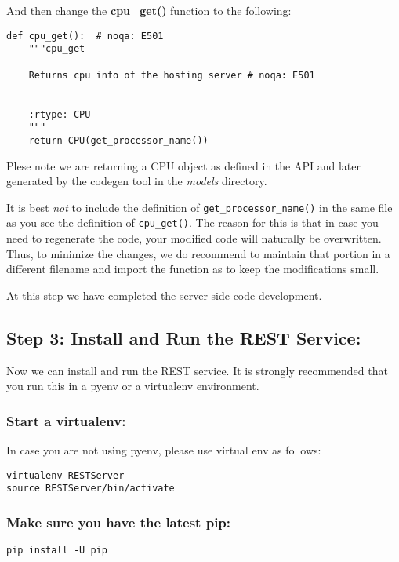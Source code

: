 And then change the \textbf{cpu\_get()} function to the following:

\begin{lstlisting}
def cpu_get():  # noqa: E501
    """cpu_get

    Returns cpu info of the hosting server # noqa: E501


    :rtype: CPU
    """
    return CPU(get_processor_name())
\end{lstlisting}

Plese note we are returning a CPU object as defined in the API and later
generated by the codegen tool in the \emph{models} directory.

It is best \emph{not} to include the definition of
\texttt{get\_processor\_name()} in the same file as you see the
definition of \texttt{cpu\_get()}. The reason for this is that in case
you need to regenerate the code, your modified code will naturally be
overwritten. Thus, to minimize the changes, we do recommend to maintain
that portion in a different filename and import the function as to keep
the modifications small.

At this step we have completed the server side code development.


\subsection{Step 3: Install and Run the REST
Service:}\label{s:step-3-swagger-codegen}

Now we can install and run the REST service. It is strongly recommended
that you run this in a pyenv or a virtualenv environment.

\subsubsection{Start a virtualenv:}\label{start-a-virtualenv}

In case you are not using pyenv, please use virtual env as follows:

\begin{lstlisting}
virtualenv RESTServer
source RESTServer/bin/activate
\end{lstlisting}

\subsubsection{Make sure you have the latest
pip:}\label{make-sure-you-have-the-latest-pip}

\begin{lstlisting}
pip install -U pip
\end{lstlisting}

